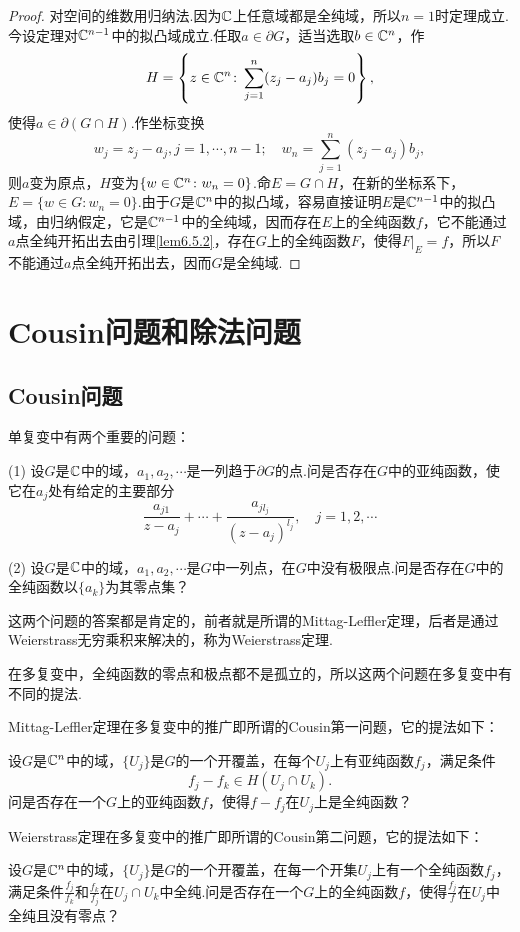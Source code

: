 \begin{proof}
	对空间的维数用归纳法.因为$\mathbb C$上任意域都是全纯域，所以$n=1$时定理成立.今设定理对$\mathbb C^{n-1}$中的拟凸域成立.任取$a\in\partial G$，适当选取$b\in\mathbb C^n$，作
	\[H=\left\{z\in\mathbb C^n\colon\sum_{j=1}^{n}(z_j-a_j)b_j=0\right\},\]
	使得$a\in\partial(G\cap H)$.作坐标变换
	\[w_j=z_j-a_j,j=1,\cdots,n-1;\quad w_n=\sum_{j=1}^{n}(z_j-a_j)b_j,\]
	则$a$变为原点，$H$变为$\{w\in\mathbb C^n\colon w_n=0\}$.命$E=G\cap H$，在新的坐标系下，$E=\{w\in G\colon w_n=0\}$.由于$G$是$\mathbb C^n$中的拟凸域，容易直接证明$E$是$\mathbb C^{n-1}$中的拟凸域，由归纳假定，它是$\mathbb C^{n-1}$中的全纯域，因而存在$E$上的全纯函数$f$，它不能通过$a$点全纯开拓出去由引理\ref{lem6.5.2}，存在$G$上的全纯函数$F$，使得$F|_E=f$，所以$F$不能通过$a$点全纯开拓出去，因而$G$是全纯域.
\end{proof}
\section{Cousin问题和除法问题\label{sec6.6}}
\subsection{Cousin问题}
单复变中有两个重要的问题：

(1)
设$G$是$\mathbb C$中的域，$a_1,a_2,\cdots$是一列趋于$\partial G$的点.问是否存在$G$中的亚纯函数，使它在$a_j$处有给定的主要部分
\[\frac{a_{j1}}{z-a_j}+\cdots+\frac{a_{jl_j}}{(z-a_j)^{l_j}},\quad j=1,2,\cdots\]

(2)
设$G$是$\mathbb C$中的域，$a_1,a_2,\cdots$是$G$中一列点，在$G$中没有极限点.问是否存在$G$中的全纯函数以$\{a_k\}$为其零点集？

这两个问题的答案都是肯定的，前者就是所谓的Mittag-Leffler定理，后者是通过Weierstrass无穷乘积来解决的，称为Weierstrass定理.

在多复变中，全纯函数的零点和极点都不是孤立的，所以这两个问题在多复变中有不同的提法.

Mittag-Leffler定理在多复变中的推广即所谓的Cousin第一问题，它的提法如下：

设$G$是$\mathbb C^n$中的域，$\{U_j\}$是$G$的一个开覆盖，在每个$U_j$上有亚纯函数$f_j$，满足条件
\[f_j-f_k\in H(U_j\cap U_k).\]
问是否存在一个$G$上的亚纯函数$f$，使得$f-f_j$在$U_j$上是全纯函数？

Weierstrass定理在多复变中的推广即所谓的Cousin第二问题，它的提法如下：

设$G$是$\mathbb C^n$中的域，$\{U_j\}$是$G$的一个开覆盖，在每一个开集$U_j$上有一个全纯函数$f_j$，满足条件$\frac{f_j}{f_k}$和$\frac{f_k}{f_j}$在$U_j\cap U_k$中全纯.问是否存在一个$G$上的全纯函数$f$，使得$\frac{f_j}{f}$在$U_j$中全纯且没有零点？

